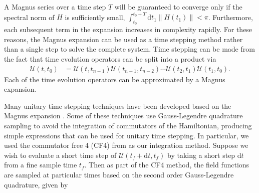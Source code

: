 \documentclass{jors}
\begin{document}

		A Magnus series over a time step \(T\) will be guaranteed to converge only if the spectral norm of \(H\) is sufficiently small, \(\int_{t_0}^{t_0 + T}\mathrm{d}t_1\|H(t_1)\| < \pi\)\cite{blanes_magnus_2009}. Furthermore, each subsequent term in the expansion increases in complexity rapidly. For these reasons, the Magnus expansion can be used as a time stepping method rather than a single step to solve the complete system. Time stepping can be made from the fact that time evolution operators can be split into a product via
		\begin{align}
			\mathcal{U}(t, t_0) &= \mathcal{U}(t, t_{n - 1})\mathcal{U}(t_{n - 1}, t_{n - 2})\cdots\mathcal{U}(t_2, t_1)\mathcal{U}(t_1, t_0).\label{eq:product_of_time_evolution}
		\end{align}
		Each of the time evolution operators can be approximated by a Magnus expansion.


		Many unitary time stepping techniques have been developed based on the Magnus expansion \cite{auer_magnus_2018}.
		Some of these techniques use Gauss-Legendre quadrature sampling to avoid the integration of commutators of the Hamiltonian, producing simple expressions that can be used for unitary time stepping.
		In particular, we used the commutator free 4 (CF4) from \cite{auer_magnus_2018} as our integration method.
		Suppose we wish to evaluate a short time step of \(\mathcal{U}(t_f + \mathrm{d}t, t_f)\) by taking a short step \(\mathrm{d}t\) from a fine sample time \(t_f\).
		Then as part of the CF4 method, the field functions are sampled at particular times based on the second order Gauss-Legendre quadrature, given by
			
\end{document}
